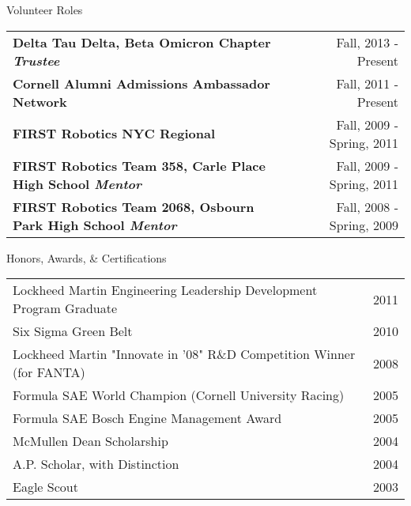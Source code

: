 \documentclass{resume} %
\begin{document}

\begin{rSection}{Volunteer Roles}
    \begin{tabular}{ @{} >{\bfseries}l @{\hspace{6ex}}r }
    Delta Tau Delta, Beta Omicron Chapter \textit{Trustee} & Fall, 2013 - Present \\
    Cornell Alumni Admissions Ambassador Network & Fall, 2011 - Present \\
    FIRST Robotics NYC Regional & Fall, 2009 - Spring, 2011 \\
    FIRST Robotics Team 358, Carle Place High School \textit{Mentor} & Fall, 2009 - Spring, 2011 \\
    FIRST Robotics Team 2068, Osbourn Park High School \textit{Mentor} & Fall, 2008 - Spring, 2009 \\
    \end{tabular}
\end{rSection}



\begin{rSection}{Honors, Awards, \& Certifications}
    \begin{tabular}{ @{} >{}l @{\hspace{18ex}} r }
    Lockheed Martin Engineering Leadership Development Program Graduate & 2011\\
    Six Sigma Green Belt & 2010 \\
    Lockheed Martin "Innovate in '08" R\&D Competition Winner (for FANTA) & 2008 \\
    Formula SAE World Champion (Cornell University Racing) & 2005 \\
    Formula SAE Bosch Engine Management Award & 2005 \\
    McMullen Dean Scholarship & 2004 \\
    A.P. Scholar, with Distinction & 2004 \\
    Eagle Scout & 2003
    \end{tabular}
\end{rSection}

\end{document}

